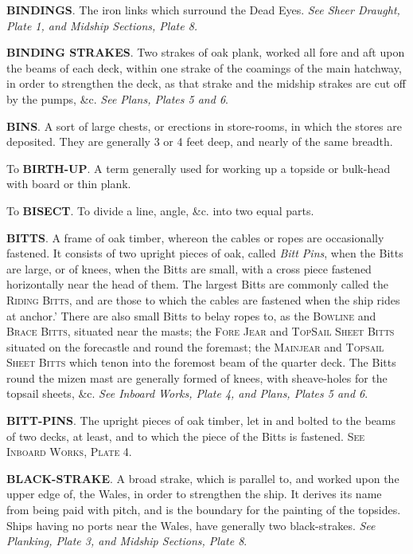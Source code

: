 \textbf{BINDINGS}. The iron links which surround the Dead Eyes. \textit{See Sheer Draught, Plate 1, and Midship Sections, Plate 8.} 

\textbf{BINDING STRAKES}. Two strakes of oak plank, worked all fore and aft upon the beams of each deck, within one strake of the coamings of the main hatchway, in order to strengthen the deck, as that strake and the midship strakes are cut off by the pumps, \&c. \textit{See Plans, Plates 5 and 6}. 

\textbf{BINS}. A sort of large chests, or erections in store-rooms, in which the stores are deposited. They are generally 3 or 4 feet deep, and nearly of the same breadth. 

To \textbf{BIRTH-UP}. A term generally used for working up a topside or bulk-head with board or thin plank. 

To \textbf{BISECT}. To divide a line, angle, \&c. into two equal parts. 

\textbf{BITTS}. A frame of oak timber, whereon the cables or ropes are occasionally fastened. It consists of two upright pieces of oak, called \textit{Bitt Pins}, when the Bitts are large, or of knees, when the Bitts are small, with a cross piece fastened horizontally near the head of them. The largest Bitts are commonly called the \textsc{Riding Bitts}, and are those to which the cables are fastened when the ship rides at anchor.' There are also small Bitts to belay ropes to, as the \textsc{Bowline} and \textsc{Brace Bitts}, situated near the masts; the \textsc{Fore Jear} and \textsc{TopSail Sheet Bitts} situated on the forecastle and round the foremast; the \textsc{Mainjear} and \textsc{Topsail Sheet Bitts} which tenon into the foremost beam of the quarter deck. The Bitts round the mizen mast are generally formed of knees, with sheave-holes for the topsail sheets, \&c. \textit{See Inboard Works, Plate 4, and Plans, Plates 5 and 6}. 

\textbf{BITT-PINS}. The upright pieces of oak timber, let in and bolted to the beams of two decks, at least, and to which the piece of the Bitts is fastened. \textsc{See Inboard Works, Plate 4.} 

\textbf{BLACK-STRAKE}. A broad strake, which is parallel to, and worked upon the upper edge of, the Wales, in order to strengthen the ship. It derives its name from being paid with pitch, and is the boundary for the painting of the topsides. Ships having no ports near the Wales, have generally two black-strakes. \textit{See Planking, Plate 3, and Midship Sections, Plate 8}.

